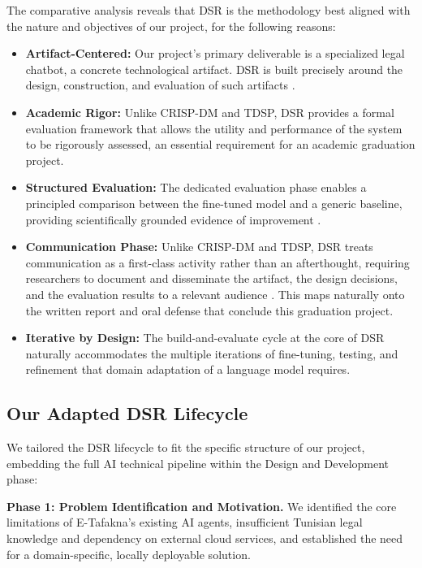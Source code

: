 The comparative analysis reveals that \ac{DSR} \cite{hevner2004design, peffers2007dsrm} 
is the methodology best aligned with the nature and objectives of our project, for 
the following reasons:

\begin{itemize}
    \item \textbf{Artifact-Centered:} Our project's primary deliverable is a 
    specialized legal chatbot, a concrete technological artifact. \ac{DSR} is built 
    precisely around the design, construction, and evaluation of such artifacts 
    \cite{hevner2004design}.
    \item \textbf{Academic Rigor:} Unlike \ac{CRISP-DM} and \ac{TDSP}, \ac{DSR} 
    provides a formal evaluation framework that allows the utility and performance of 
    the system to be rigorously assessed, an essential requirement for an academic 
    graduation project.
    \item \textbf{Structured Evaluation:} The dedicated evaluation phase enables a 
    principled comparison between the fine-tuned model and a generic baseline, 
    providing scientifically grounded evidence of improvement \cite{peffers2007dsrm}.
    \item \textbf{Communication Phase:} Unlike \ac{CRISP-DM} and \ac{TDSP}, \ac{DSR}
    treats communication as a first-class activity rather than an afterthought, requiring
    researchers to document and disseminate the artifact, the design decisions, and the
    evaluation results to a relevant audience \cite{peffers2007dsrm}. This maps naturally
    onto the written report and oral defense that conclude this graduation project.
    \item \textbf{Iterative by Design:} The build-and-evaluate cycle at the core of 
    \ac{DSR} \cite{hevner2004design} naturally accommodates the multiple iterations 
    of fine-tuning, testing, and refinement that domain adaptation of a language model 
    requires.
\end{itemize}

\subsection{Our Adapted DSR Lifecycle}

We tailored the \ac{DSR} lifecycle \cite{peffers2007dsrm} to fit the specific 
structure of our project, embedding the full \ac{AI} technical pipeline within the 
Design and Development phase:

\textbf{Phase 1: Problem Identification and Motivation.}
We identified the core limitations of E-Tafakna's existing \ac{AI} agents, 
insufficient Tunisian legal knowledge and dependency on external cloud services, 
and established the need for a domain-specific, locally deployable solution.

